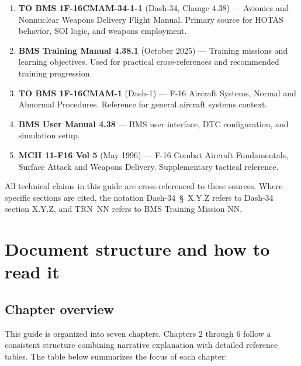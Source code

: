 \documentclass[11pt, a4paper, twoside]{report}
\newcommand{\dashref}[1]{Dash-34~\S~#1}
\newcommand{\trnref}[1]{TRN~#1}
\begin{document}
\begin{enumerate}
	\item \textbf{TO BMS 1F-16CMAM-34-1-1} (Dash-34, Change 4.38) --- Avionics and Nonnuclear Weapons Delivery Flight Manual. Primary source for HOTAS behavior, SOI logic, and weapons employment.
	\item \textbf{BMS Training Manual 4.38.1} (October 2025) --- Training missions and learning objectives. Used for practical cross-references and recommended training progression.
	\item \textbf{TO BMS 1F-16CMAM-1} (Dash-1) --- F-16 Aircraft Systems, Normal and Abnormal Procedures. Reference for general aircraft systems context.
	\item \textbf{BMS User Manual 4.38} --- BMS user interface, DTC configuration, and simulation setup.
	\item \textbf{MCH 11-F16 Vol 5} (May 1996) --- F-16 Combat Aircraft Fundamentals, Surface Attack and Weapons Delivery. Supplementary tactical reference.
\end{enumerate}

All technical claims in this guide are cross-referenced to these sources. Where specific sections are cited, the notation \dashref{X.Y.Z} refers to Dash-34 section X.Y.Z, and \trnref{NN} refers to BMS Training Mission NN.

\section{Document structure and how to read it}
\label{sec:C1-S3}

\subsection{Chapter overview}
\label{sec:C1-S3-S1}

This guide is organized into seven chapters. Chapters 2 through 6 follow a consistent structure combining narrative explanation with detailed reference tables. The table below summarizes the focus of each chapter:
\end{document}

